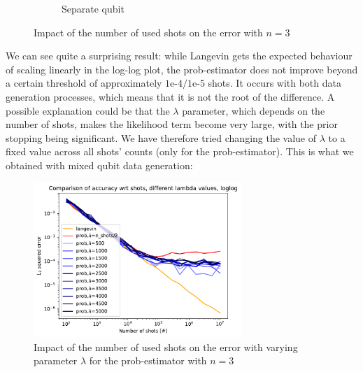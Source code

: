 \documentclass[12pt]{memoir}
\begin{document}
\begin{figure}[H]
\begin{subfigure}[b]{0.49\textwidth}
        \caption{Separate qubit}

        \label{fig:shots-comp-sep-sub}

    \end{subfigure}

    \caption{Impact of the number of used shots on the error with $n=3$}

    \label{fig:shots-comp}

\end{figure}

We can see quite a surprising result: while Langevin gets the expected behaviour of scaling linearly in the log-log plot, the prob-estimator does not improve beyond a certain threshold of approximately $1\text{e-}4/1\text{e-}5$ shots. It occurs with both data generation processes, which means that it is not the root of the difference. A possible explanation could be that the $\lambda$ parameter, which depends on the number of shots, makes the likelihood term become very large, with the prior stopping being significant. We have therefore tried changing the value of $\lambda$ to a fixed value across all shots' counts (only for the prob-estimator). This is what we obtained with mixed qubit data generation:


\begin{figure}[H]


    \centering

    \includegraphics[width=0.7\textwidth]{figures/experiments/shots/shots_acc_comp_shots_exp_lambda_prob_with_var_lambda_loglog-1.png}

    \caption{Impact of the number of used shots on the error with varying parameter $\lambda$ for the prob-estimator with $n=3$}

    \label{fig:shots-comp-prob-var-lambda}

\end{figure}
\end{document}
